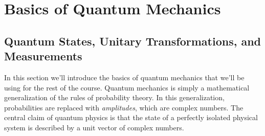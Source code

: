 \documentclass[12pt]{report}
\theoremstyle{plain}
\theoremstyle{definition}
\begin{document}
\section{Basics of Quantum Mechanics}

\subsection{Quantum States, Unitary Transformations, and Measurements}

In this section we'll introduce the basics of quantum mechanics that we'll be using for the rest of the course. Quantum mechanics is simply a mathematical generalization of the rules of probability theory. In this generalization, probabilities are replaced with \emph{amplitudes}, which are complex numbers. The central claim of quantum physics is that the state of a perfectly isolated physical system is described by a unit vector of complex numbers.
\end{document}
